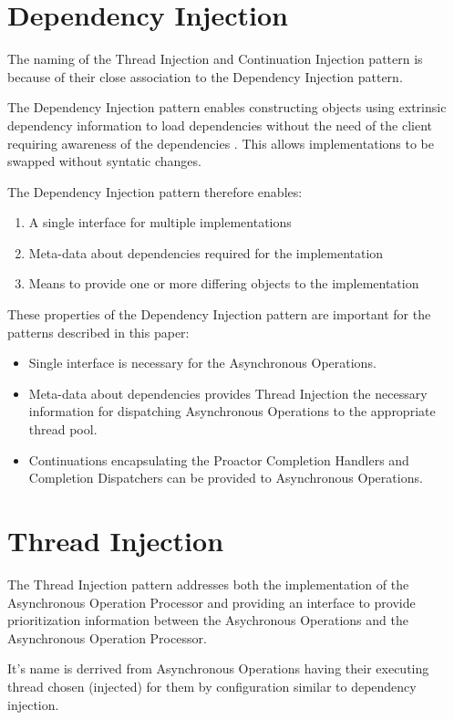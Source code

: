 \documentclass{article}
\begin{document}
\section{Dependency Injection}

The naming of the Thread Injection and Continuation Injection pattern is because
of their close association to the Dependency Injection pattern.

The Dependency Injection pattern enables constructing objects using extrinsic
dependency information to load dependencies without the need of the client
requiring awareness of the dependencies \cite{ioc}.  This allows implementations
to be swapped without syntatic changes.

The Dependency Injection pattern therefore enables:
\begin{enumerate}
  \item A single interface for multiple implementations
  \item Meta-data about dependencies required for the implementation
  \item Means to provide one or more differing objects to the implementation
\end{enumerate}

These properties of the Dependency Injection pattern are important for the
patterns described in this paper:
\begin{itemize}
  \item Single interface is necessary for the Asynchronous Operations.
  \item Meta-data about dependencies provides Thread Injection the necessary information for dispatching Asynchronous Operations to the appropriate thread pool.
  \item Continuations encapsulating the Proactor Completion Handlers and Completion Dispatchers can be provided to Asynchronous Operations.
\end{itemize}

\section{Thread Injection}

The Thread Injection pattern addresses both the implementation of the
Asynchronous Operation Processor and providing an interface to provide
prioritization information between the Asychronous Operations and the
Asynchronous Operation Processor.

It's name is derrived from Asynchronous Operations having their executing thread
chosen (injected) for them by configuration similar to dependency injection.
\end{document}
